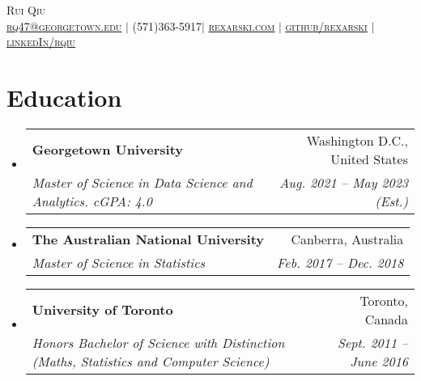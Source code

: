 \documentclass[letterpaper,10pt]{article}
\makeatletter
\newcommand{\resumeSubheading}[4]{
  \vspace{-1pt}\item
    \begin{tabular*}{0.97\textwidth}[t]{l@{\extracolsep{\fill}}r}
      \small\textbf{#1} & {\small #2} \\
      \small\textit{\small#3} & \textit{\small #4} \\
    \end{tabular*}\vspace{-8pt}
}
\newcommand{\resumeSubheadingMore}[6]{
  \vspace{-1pt}\item
    \begin{tabular*}{0.97\textwidth}[t]{l@{\extracolsep{\fill}}r}
      \textbf{#1} & #2 \\
      \textit{\small#3} & \textit{\small #4} \\
      \textit{\small#5} & \textit{\small #6} \\
    \end{tabular*}\vspace{-8pt}
}
\newcommand{\resumeSubHeadingListStart}{\begin{itemize}[leftmargin=*]}
\newcommand{\resumeSubHeadingListEnd}{\end{itemize}}
\makeatother
\begin{document}

\newcommand{\yourName}{Rui Qiu}
\newcommand{\yourWebsite}{rexarski.com}
\newcommand{\yourWebsiteLink}{https://rexarski.com}
\newcommand{\yourEmail}{rq47@georgetown.edu}
\newcommand{\yourPhone}{(571)363-5917}
\newcommand{\githubUserName}{rexarski}
\newcommand{\linkedInUserName}{rqiu}

\begin{center}
    \Huge \scshape \yourName \\ \vspace{1pt}
    \small \href{mailto:\yourEmail}{\underline{\yourEmail}}  $|$  \yourPhone $|$
    \href{\yourWebsiteLink}{\underline{\yourWebsite}} $|$
    \href{https://github.com/\githubUserName}{\underline{github/\githubUserName}} $|$
    \href{https://www.linkedin.com/in/\linkedInUserName}{\underline{linkedIn/\linkedInUserName}}
\end{center}

\section{Education}
  \resumeSubHeadingListStart
    \resumeSubheading
      {Georgetown University}{Washington D.C., United States}
      {Master of Science in Data Science and Analytics. cGPA: 4.0}{Aug. 2021 -- May 2023 (Est.)}
    \resumeSubheading
      {The Australian National University}{Canberra, Australia}
      {Master of Science in Statistics}{Feb. 2017 -- Dec. 2018}
    \resumeSubheading
      {University of Toronto}{Toronto, Canada}
      {Honors Bachelor of Science with Distinction (Maths, Statistics and Computer Science)}{Sept. 2011 -- June 2016}
  \resumeSubHeadingListEnd

\end{document}

